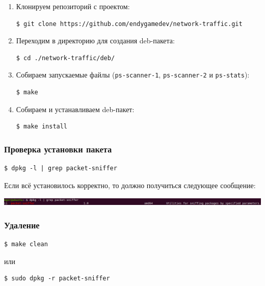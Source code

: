\begin{enumerate}
\item Клонируем репозиторий с проектом:
\begin{lstlisting}
$ git clone https://github.com/endygamedev/network-traffic.git
\end{lstlisting}

\item Переходим в директорию для создания deb-пакета:
\begin{lstlisting}
$ cd ./network-traffic/deb/
\end{lstlisting}

\newpage

\item Собираем запускаемые файлы (\verb|ps-scanner-1|, \verb|ps-scanner-2| и \verb|ps-stats|):
\begin{lstlisting}
$ make
\end{lstlisting}

\item Собираем и устанавливаем deb-пакет:
\begin{lstlisting}
$ make install
\end{lstlisting}
\end{enumerate}

\subsubsection*{Проверка установки пакета}

\begin{lstlisting}
$ dpkg -l | grep packet-sniffer
\end{lstlisting}
\indent Если всё установилось корректно, то должно получиться следующее сообщение:
\vspace{-0.8cm}
\begin{center}
    \includegraphics[scale=0.32]{../assets/check.png}
\end{center}

\subsubsection*{Удаление}

\begin{lstlisting}
$ make clean
\end{lstlisting}
или
\begin{lstlisting}
$ sudo dpkg -r packet-sniffer
\end{lstlisting}
